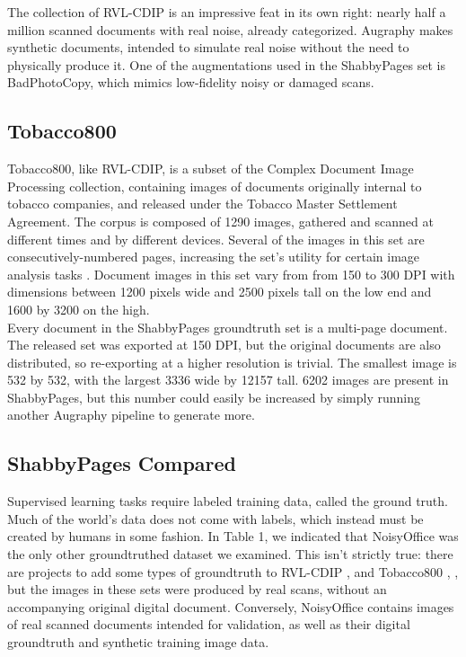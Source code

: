 \documentclass[runningheads]{llncs}
\begin{document}
The collection of RVL-CDIP is an impressive feat in its own right: nearly half a million scanned documents with real noise, already categorized. Augraphy makes synthetic documents, intended to simulate real noise without the need to physically produce it. One of the augmentations used in the ShabbyPages set is BadPhotoCopy, which mimics low-fidelity noisy or damaged scans.

\subsection{Tobacco800}
Tobacco800, like RVL-CDIP, is a subset of the Complex Document Image Processing collection, containing images of documents originally internal to tobacco companies, and released under the Tobacco Master Settlement Agreement. The corpus is composed of 1290 images, gathered and scanned at different times and by different devices. Several of the images in this set are consecutively-numbered pages, increasing the set's utility for certain image analysis tasks \cite{ref_Tobacco800}. Document images in this set vary from from 150 to 300 DPI with dimensions between 1200 pixels wide and 2500 pixels tall on the low end and 1600 by 3200 on the high.\\

Every document in the ShabbyPages groundtruth set is a multi-page document. The released set was exported at 150 DPI, but the original documents are also distributed, so re-exporting at a higher resolution is trivial. The smallest image is 532 by 532, with the largest 3336 wide by 12157 tall. 6202 images are present in ShabbyPages, but this number could easily be increased by simply running another Augraphy pipeline to generate more.

\subsection{ShabbyPages Compared}
Supervised learning tasks require labeled training data, called the ground truth. Much of the world's data does not come with labels, which instead must be created by humans in some fashion. In Table 1, we indicated that NoisyOffice was the only other groundtruthed dataset we examined. This isn't strictly true: there are projects to add some types of groundtruth to RVL-CDIP \cite{ref_goldmann}, \cite{ref_zenodo} and Tobacco800 \cite{ref_tobacco800gt1}, \cite{ref_tobacco800gt2}, but the images in these sets were produced by real scans, without an accompanying original digital document. Conversely, NoisyOffice contains images of real scanned documents intended for validation, as well as their digital groundtruth and synthetic training image data.\\
\end{document}
